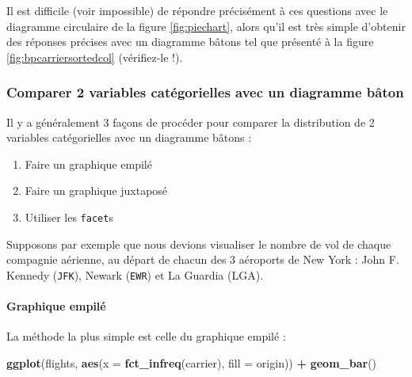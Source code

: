 \documentclass[a4paperpaper,]{article}
\newenvironment{Shaded}{\begin{snugshade}}{\end{snugshade}}
\newcommand{\KeywordTok}[1]{\textcolor[rgb]{0.13,0.29,0.53}{\textbf{#1}}}
\newcommand{\DataTypeTok}[1]{\textcolor[rgb]{0.13,0.29,0.53}{#1}}
\newcommand{\StringTok}[1]{\textcolor[rgb]{0.31,0.60,0.02}{#1}}
\newcommand{\OperatorTok}[1]{\textcolor[rgb]{0.81,0.36,0.00}{\textbf{#1}}}
\newcommand{\NormalTok}[1]{#1}
\providecommand{\tightlist}{%
  \setlength{\itemsep}{0pt}\setlength{\parskip}{0pt}}
\let\oldparagraph\paragraph
\renewcommand{\paragraph}[1]{\oldparagraph{#1}\mbox{}}
\theoremstyle{definition}
\theoremstyle{definition}
\theoremstyle{definition}
\theoremstyle{remark}
\begin{document}
Il est difficile (voir impossible) de répondre précisément à ces
questions avec le diagramme circulaire de la figure \ref{fig:piechart},
alors qu'il est très simple d'obtenir des réponses précises avec un
diagramme bâtons tel que présenté à la figure
\ref{fig:bpcarriersortedcol} (vérifiez-le !).

\subsubsection{Comparer 2 variables catégorielles avec un diagramme
bâton}\label{comparer-2-variables-categorielles-avec-un-diagramme-baton}

Il y a généralement 3 façons de procéder pour comparer la distribution
de 2 variables catégorielles avec un diagramme bâtons :

\begin{enumerate}
\def\labelenumi{\arabic{enumi}.}
\tightlist
\item
  Faire un graphique empilé
\item
  Faire un graphique juxtaposé
\item
  Utiliser les \texttt{facet}s
\end{enumerate}

Supposons par exemple que nous devions visualiser le nombre de vol de
chaque compagnie aérienne, au départ de chacun des 3 aéroports de New
York : John F. Kennedy (\texttt{JFK}), Newark (\texttt{EWR}) et La
Guardia (LGA).

\paragraph{Graphique empilé}\label{graphique-empile}

La méthode la plus simple est celle du graphique empilé :

\begin{Shaded}
\begin{Highlighting}[]
\KeywordTok{ggplot}\NormalTok{(flights, }\KeywordTok{aes}\NormalTok{(}\DataTypeTok{x =} \KeywordTok{fct_infreq}\NormalTok{(carrier), }\DataTypeTok{fill =}\NormalTok{ origin)) }\OperatorTok{+}
\StringTok{  }\KeywordTok{geom_bar}\NormalTok{()}
\end{Highlighting}
\end{Shaded}
\end{document}
